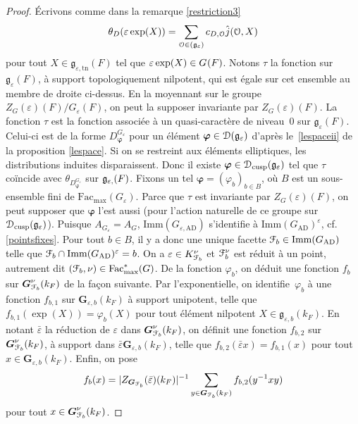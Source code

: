 \documentclass[11pt]{article}
\newcommand{\cf}{cf.\xspace}
\numberwithin{equation}{section}\providecommand{\og}{«\,}\providecommand{\fg}{\,»}
\let\mathcal \EuScript
\newcommand{\NoChangel}[1]{%
\expandafter\let\csname old\string#1\endcsname=#1
\let#1=\relax
\newcommand{#1}{\mathcode`l="716C\csname old\string#1\endcsname\mathcode`l="7160 }%
}
\let\epsilon\varepsilon
\newcommand{\frg}{\mathfrak{g}}
\newcommand{\AD}{\mathrm{AD}}
\newcommand{\cusp}{\mathrm{cusp}}
\newcommand{\rell}{\mathrm{ell}} \NoChangel{\rell}
\newcommand{\Fac}{\mathrm{Fac}}
\newcommand{\Imm}{\mathrm{Imm}}
\newcommand{\Nil}{\mathrm{Nil}} \NoChangel{\Nil}
\newcommand{\tn}{\mathrm{tn}}
\newcommand{\bG}{\boldsymbol{G}}
\newcommand{\cD}{\mathcal{D}}
\newcommand{\cF}{\mathcal{F}}
\newcommand{\cO}{\mathcal{O}}
\theoremstyle{plain}
\theoremstyle{definition}
\begin{document}
\begin{proof}
Écrivons comme dans la remarque \eqref{restriction3}
\[
\theta_{D}(\epsilon \exp(X))=\sum_{\cO\in \Nil(\frg_{\epsilon})}c_{D,\cO}\hat{j}(\cO,X)
\]
pour tout $X\in \frg_{\epsilon,\tn}(F)$ tel que $\epsilon \exp(X)\in G_{\rell}(F)$.
Notons $\tau$ la fonction sur $\frg_{\epsilon}(F)$, à support topologiquement nilpotent, qui est égale sur cet ensemble au membre de droite ci-dessus. En la moyennant sur le groupe $Z_{G}(\epsilon)(F)/G_{\epsilon}(F)$, on peut la supposer invariante par $Z_{G}(\epsilon)(F)$. La fonction $\tau$ est
la fonction associée à un quasi-caractère de niveau~$0$ sur $\frg_{\epsilon}(F)$. Celui-ci est de la forme $D^{G_{\epsilon}}_{\boldsymbol{\varphi}}$ pour un élément $\boldsymbol{\varphi}\in \cD(\frg_{\epsilon})$ d'après le~\eqref{lespaceii} de la proposition \ref{lespace}. Si on se restreint aux éléments elliptiques, les distributions induites disparaissent. Donc il existe $\boldsymbol{\varphi}\in \cD_{\cusp}(\frg_{\epsilon})$ tel que $\tau$ coïncide avec $\theta_{D^{G_{\epsilon}}_{\boldsymbol{\varphi}}}$ sur $\frg_{\epsilon,\rell}(F)$. Fixons un tel $\boldsymbol{\varphi}=(\varphi_{b})_{b\in B}$, où $B$ est un sous-ensemble fini de $\Fac_{\max}(G_{\epsilon})$. Parce que $\tau$ est invariante par $Z_{G}(\epsilon)(F)$, on peut supposer que $\boldsymbol{\varphi}$ l'est aussi (pour l'action naturelle de ce groupe sur $\cD_{\cusp}(\frg_{\epsilon})$).
Puisque $A_{G_{\epsilon}}=A_{G}$, $\Imm(G_{\epsilon,\AD})$ s'identifie à $\Imm(G_{\AD})^{\epsilon}$, \cf \ref{pointsfixes}. Pour tout $b\in B$, il y a donc une unique facette $\cF_{b}\in \Imm(G_{\AD})$ telle que $\cF_{b}\cap \Imm(G_{\AD})^{\epsilon}=b$. On a $\epsilon\in K_{\cF_{b}}^{\nu}$ et $\cF_{b}^{\nu}$ est réduit à un point, autrement dit $(\cF_{b},\nu)\in \Fac^*_{\max}(G)$. De la fonction $\varphi_{b}$, on déduit une fonction $f_{b}$ sur $\bG_{\cF_{b}}^{\nu}(k_{F})$ de la façon suivante. Par l'exponentielle, on identifie~$\varphi_{b}$ à une fonction $f_{b,1}$ sur $\bG_{\epsilon,b}(k_{F})$ à support unipotent, telle que $f_{b,1}(\exp(X))=\varphi_{b}(X)$ pour tout élément nilpotent $X\in \boldsymbol{\frg}_{\epsilon,b}(k_{F})$. En notant $\bar{\epsilon}$ la réduction de $\epsilon$ dans $\bG_{\cF_{b}}^{\nu}(k_{F})$, on définit une fonction $f_{b,2}$ sur $\bG_{\cF_{b}}^{\nu}(k_{F})$, à support dans $\bar{\epsilon}\bG_{\epsilon,b}(k_{F})$, telle que $f_{b,2}(\bar{\epsilon}x)=f_{b,1}(x)$ pour tout $x\in \bG_{\epsilon,b}(k_{F})$. Enfin, on pose
\[
f_{b}(x)=\vert Z_{\bG_{\cF_{b}}}(\bar{\epsilon})(k_{F})\vert ^{-1}
\sum_{y\in \bG_{\cF_{b}}(k_{F})}f_{b,2}(y^{-1}xy)
\]
pour tout $x\in \bG_{\cF_{b}}^{\nu}(k_{F})$.


\end{proof}
\end{document}
